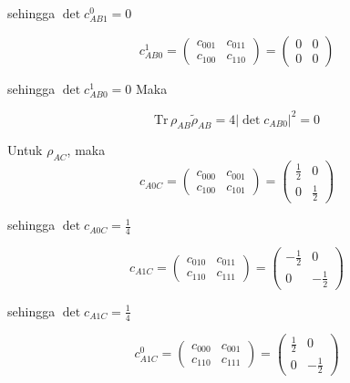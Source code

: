 \begin{enumerate}
	sehingga $\det c_{AB1}^0 = 0$
	
	\begin{equation}
		c_{AB0}^1=
		\begin{pmatrix}
			c_{001} & c_{011} \\
			c_{100} & c_{110}
		\end{pmatrix}=
		\begin{pmatrix}
			0 & 0 \\
			0 & 0
		\end{pmatrix}
	\end{equation}
	
	sehingga $\det c_{AB0}^1 = 0$
	Maka
	
	\begin{equation}
		\mathrm{Tr}\,\rho_{AB}\tilde{\rho}_{AB}=4|\det c_{AB0}|^2=0
	\end{equation}
	
	Untuk $\rho_{AC}$, maka
	\begin{equation}
		c_{A0C}=
		\begin{pmatrix}
			c_{000} & c_{001} \\
			c_{100} & c_{101}
		\end{pmatrix}=
		\begin{pmatrix}
			\frac{1}{2} & 0 \\
			0 & \frac{1}{2}
		\end{pmatrix}
	\end{equation}
	
	sehingga $\det c_{A0C} = \frac{1}{4}$
	
	\begin{equation}
		c_{A1C}=
		\begin{pmatrix}
			c_{010} & c_{011} \\
			c_{110} & c_{111}
		\end{pmatrix}=
		\begin{pmatrix}
			-\frac{1}{2} & 0 \\
			0 & -\frac{1}{2}
		\end{pmatrix}
	\end{equation}
	
	sehingga $\det c_{A1C} = \frac{1}{4}$
	
	\begin{equation}
		c_{A1C}^0=
		\begin{pmatrix}
			c_{000} & c_{001} \\
			c_{110} & c_{111}
		\end{pmatrix}=
		\begin{pmatrix}
			\frac{1}{2} & 0 \\
			0 & -\frac{1}{2}
		\end{pmatrix}
	\end{equation}
	

\end{enumerate}
